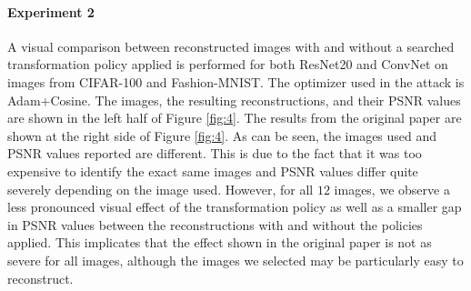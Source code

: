 \paragraph{Experiment 2} A visual comparison between reconstructed images with and without a searched transformation policy applied is performed for both ResNet20 and ConvNet on images from CIFAR-100 and Fashion-MNIST. The optimizer used in the attack is Adam+Cosine. The images, the resulting reconstructions, and their PSNR values are shown in the left half of Figure \ref{fig:4}. The results from the original paper are shown at the right side of Figure \ref{fig:4}. As can be seen, the images used and PSNR values reported are different. This is due to the fact that it was too expensive to identify the exact same images and PSNR values differ quite severely depending on the image used. However, for all $12$ images, we observe a less pronounced visual effect of the transformation policy as well as a smaller gap in PSNR values between the reconstructions with and without the policies applied. This implicates that the effect shown in the original paper is not as severe for all images, although the images we selected may be particularly easy to reconstruct.

